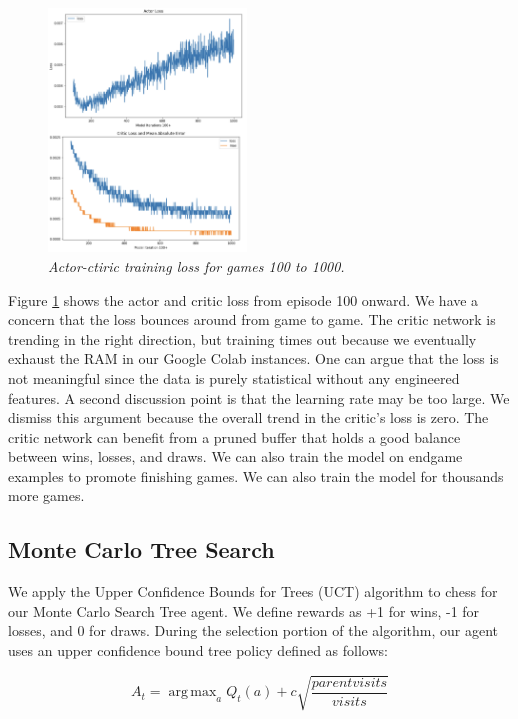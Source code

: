 \documentclass[12pt]{turabian-researchpaper}
\DeclareMathOperator*{\argmax}{arg\,max}
\begin{document}
\begin{figure}[!ht]
    \centering
    \includegraphics[width=0.47\textwidth]{ac_loss_200-1k.png}
    \caption{\textit{ Actor-ctiric training loss for games 100 to 1000.}}
    \label{fig:ac_a_loss_200}
\end{figure}

Figure \ref{fig:ac_a_loss_200} shows the actor and critic loss from episode 100 onward. We have a concern that the loss bounces around from game to game. The critic network is trending in the right direction, but training times out because we eventually exhaust the RAM in our Google Colab instances. One can argue that the loss is not meaningful since the data is purely statistical without any engineered features. A second discussion point is that the learning rate may be too large. We dismiss this argument because the overall trend in the critic’s loss is zero. The critic network can benefit from a pruned buffer that holds a good balance between wins, losses, and draws. We can also train the model on endgame examples to promote finishing games. We can also train the model for thousands more games. 

\subsection{Monte Carlo Tree Search}

We apply the Upper Confidence Bounds for Trees (UCT) algorithm to chess for our Monte Carlo Search Tree agent. We define rewards as +1 for wins, -1 for losses, and 0 for draws. During the selection portion of the algorithm, our agent uses an upper confidence bound tree policy defined as follows: 

\[A_t = \argmax_a{Q_t(a) + c \sqrt{\frac{parent visits}{visits}}} \]
\end{document}
